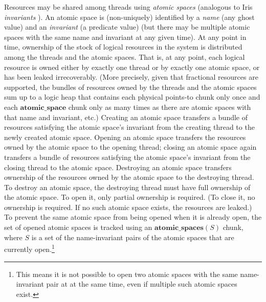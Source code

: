 \documentclass{article}
\begin{document}
Resources may be shared among threads using \emph{atomic spaces} (analogous to Iris \emph{invariants} \cite{iris1,iris-ground-up}). An atomic space is (non-uniquely) identified by a \emph{name} (any ghost value) and an \emph{invariant} (a predicate value) (but there may be multiple atomic spaces with the same name and invariant at any given time). At any point in time, ownership of the stock of logical resources in the system is distributed among the threads and the atomic spaces. That is, at any point, each logical resource is owned either by exactly one thread or by exactly one atomic space, or has been leaked irrecoverably. (More precisely, given that fractional resources are supported, the bundles of resources owned by the threads and the atomic spaces sum up to a logic heap that contains each physical points-to chunk only once and each $\mathbf{atomic\_space}$ chunk only as many times as there are atomic spaces with that name and invariant, etc.) Creating an atomic space transfers a bundle of resources satisfying the atomic space's invariant from the creating thread to the newly created atomic space. Opening an atomic space transfers the resources owned by the atomic space to the opening thread; closing an atomic space again transfers a bundle of resources satisfying the atomic space's invariant from the closing thread to the atomic space. Destroying an atomic space transfers ownership of the resources owned by the atomic space to the destroying thread. To destroy an atomic space, the destroying thread must have full ownership of the atomic space. To open it, only partial ownership is required. (To close it, no ownership is required. If no such atomic space exists, the resources are leaked.) To prevent the same atomic space from being opened when it is already open, the set of opened atomic spaces is tracked using an $\mathbf{atomic\_spaces}(S)$ chunk, where $S$ is a set of the name-invariant pairs of the atomic spaces that are currently open.\footnote{This means it is not possible to open two atomic spaces with the same name-invariant pair at at the same time, even if multiple such atomic spaces exist.}
\end{document}
